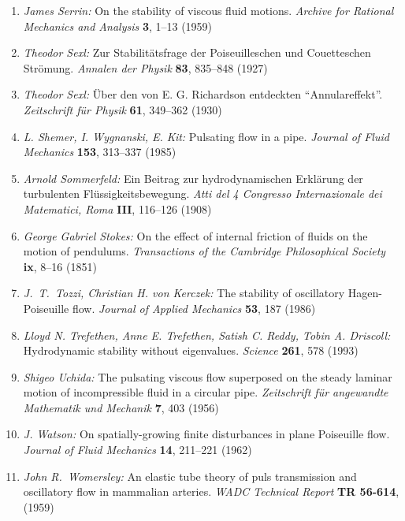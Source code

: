 \documentclass[10pt,a5paper,oneside,draft]{book}
\numberwithin{equation}{chapter}
\begin{document}
\begin{enumerate}
	\item \textsl{James Serrin:} On the stability of viscous fluid motions. \textit{Archive for Rational Mechanics and Analysis} \textbf{3}, 1--13 (1959)\bibfill\pageref{bib:serrin}
	\item \textsl{Theodor Sexl:} {Z}ur {S}tabilit{\"a}tsfrage der {P}oiseuilleschen und {C}ouetteschen {S}tr{\"o}mung. \textit{Annalen der Physik} \textbf{83}, 835--848 (1927)\bibfill\pageref{bib:sexl}
	\item \textsl{Theodor Sexl:} {\"U}ber den von {E}. {G}. {R}ichardson entdeckten ``{A}nnulareffekt''. \textit{Zeitschrift f{\"u}r Physik} \textbf{61}, 349--362 (1930)\bibfill\pageref{bib:sexl2}
	\item \textsl{L. Shemer, I. Wygnanski, E. Kit:} Pulsating flow in a pipe. \textit{Journal of Fluid Mechanics} \textbf{153}, 313--337 (1985)\bibfill\pageref{bib:shemer_wygnanski}
	\item \textsl{Arnold Sommerfeld:} Ein {B}eitrag zur hydrodynamischen {E}rkl{\"a}rung der turbulenten {F}l{\"u}ssigkeitsbewegung. \textit{Atti del 4 Congresso Internazionale dei Matematici, Roma} \textbf{III}, 116--126 (1908)\bibfill\pageref{bib:sommerfeld_congresso}
	\item \textsl{George Gabriel Stokes:} On the effect of internal friction of fluids on the motion of pendulums. \textit{Transactions of the Cambridge Philosophical Society} \textbf{ix}, 8--16 (1851)\bibfill\pageref{bib:stokes}
	\item \textsl{J.~T.~Tozzi, Christian H. von Kerczek:} The stability of oscillatory {H}agen-{P}oiseuille flow. \textit{Journal of Applied Mechanics} \textbf{53}, 187 (1986)\bibfill\pageref{bib:tozzi_kerczek}
	\item \textsl{Lloyd N. Trefethen, Anne E. Trefethen, Satish C. Reddy, Tobin A. Driscoll:} Hydrodynamic stability without eigenvalues. \textit{Science} \textbf{261}, 578 (1993)\bibfill\pageref{bib:trefethen}
	\item \textsl{Shigeo Uchida:} The pulsating viscous flow superposed on the steady laminar motion of incompressible fluid in a circular pipe. \textit{Zeitschrift f{\"u}r angewandte Mathematik und Mechanik} \textbf{7}, 403 (1956)\bibfill\pageref{bib:uchida}
	\item \textsl{J. Watson:} On spatially-growing finite disturbances in plane {P}oiseuille flow. \textit{Journal of Fluid Mechanics} \textbf{14}, 211--221 (1962)\bibfill\pageref{bib:watson_j}
	\item \textsl{John R.\ Womersley:} An elastic tube theory of puls transmission and oscillatory flow in mammalian arteries. \textit{WADC Technical Report} \textbf{TR 56-614}, (1959)\bibfill\pageref{bib:womersley_rep}

\end{enumerate}
\end{document}

